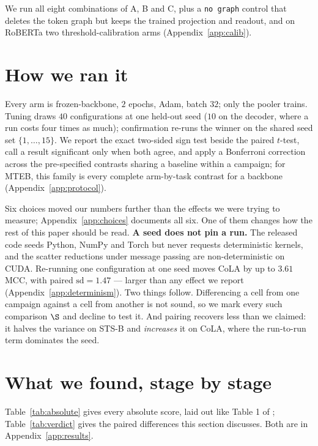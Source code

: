 \documentclass{article}
\begin{document}
We run all eight combinations of A, B and C, plus a \texttt{no graph} control
that deletes the token graph but keeps the trained projection and readout, and
on RoBERTa two threshold-calibration arms (Appendix~\ref{app:calib}).

\section{How we ran it}
\label{sec:choices}

Every arm is frozen-backbone, $2$ epochs, Adam, batch $32$; only the pooler
trains. Tuning draws $40$ configurations at one held-out seed ($10$ on the
decoder, where a run costs four times as much); confirmation re-runs the winner
on the shared seed set $\{1,\dots,15\}$. We report the exact two-sided sign test
beside the paired $t$-test, call a result significant only when both agree, and
apply a Bonferroni correction across the pre-specified contrasts sharing a
baseline within a campaign; for MTEB, this family is every complete arm-by-task
contrast for a backbone (Appendix~\ref{app:protocol}).

Six choices moved our numbers further than the effects we were trying to
measure; Appendix~\ref{app:choices} documents all six. One of them changes how
the rest of this paper should be read. \textbf{A seed does not pin a run.} The
released code seeds Python, NumPy and Torch but never requests deterministic
kernels, and the scatter reductions under message passing are non-deterministic
on CUDA. Re-running one configuration at one seed moves CoLA by up to $3.61$
MCC, with paired $\mathrm{sd}=1.47$ --- larger than any effect we report
(Appendix~\ref{app:determinism}). Two things follow. Differencing a cell from
one campaign against a cell from another is not sound, so we mark every such
comparison $\S$ and decline to test it. And pairing recovers less than we
claimed: it halves the variance on STS-B and \emph{increases} it on CoLA, where
the run-to-run term dominates the seed.

\section{What we found, stage by stage}
\label{sec:results}

Table~\ref{tab:absolute} gives every absolute score, laid out like Table 1 of
\citet{mantri2026glot}; Table~\ref{tab:verdict} gives the paired differences
this section discusses. Both are in Appendix~\ref{app:results}.
\end{document}
